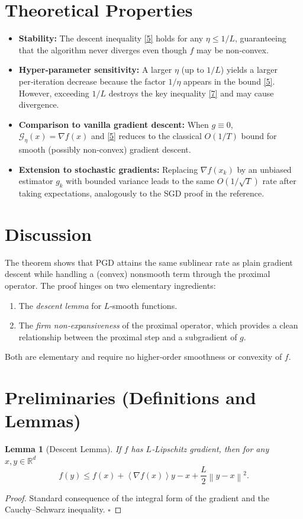 \documentclass{article}
\newtheorem{lemma}{Lemma}
\newcommand{\R}{\mathbb{R}}
\newcommand{\norm}[1]{\left\|#1\right\|}
\newcommand{\inner}[1]{\left\langle#1\right\rangle}
\newcommand{\grad}{\nabla}
\newcommand{\G}{\mathcal{G}}
\begin{document}
\section*{Theoretical Properties}
\begin{itemize}
\item \textbf{Stability:} The descent inequality \eqref{5} holds for any $\eta\le 1/L$, guaranteeing that the algorithm never diverges even though $f$ may be non‑convex.
\item \textbf{Hyper‑parameter sensitivity:} A larger $\eta$ (up to $1/L$) yields a larger per‑iteration decrease because the factor $1/\eta$ appears in the bound \eqref{5}. However, exceeding $1/L$ destroys the key inequality \eqref{7} and may cause divergence.
\item \textbf{Comparison to vanilla gradient descent:} When $g\equiv0$, $\G_{\eta}(x)=\grad f(x)$ and \eqref{5} reduces to the classical $O(1/T)$ bound for smooth (possibly non‑convex) gradient descent.
\item \textbf{Extension to stochastic gradients:} Replacing $\grad f(x_{k})$ by an unbiased estimator $g_{k}$ with bounded variance leads to the same $O(1/\sqrt{T})$ rate after taking expectations, analogously to the SGD proof in the reference.
\end{itemize}

\section*{Discussion}
The theorem shows that PGD attains the same sublinear rate as plain gradient descent while handling a (convex) nonsmooth term through the proximal operator. The proof hinges on two elementary ingredients:
\begin{enumerate}
\item The \emph{descent lemma} for $L$‑smooth functions.
\item The \emph{firm non‑expansiveness} of the proximal operator, which provides a clean relationship between the proximal step and a subgradient of $g$.
\end{enumerate}
Both are elementary and require no higher‑order smoothness or convexity of $f$.

\newpage
\section*{Preliminaries (Definitions and Lemmas)}
\begin{lemma}[Descent Lemma]\label{lem:descent}
If $f$ has $L$‑Lipschitz gradient, then for any $x,y\in\R^{d}$
\[
f(y)\le f(x)+\inner{\grad f(x)}{y-x}+\frac{L}{2}\norm{y-x}^{2}.
\tag{7}
\]
\end{lemma}
\begin{proof}
Standard consequence of the integral form of the gradient and the Cauchy–Schwarz inequality. \hfill $\square$
\end{proof}
\end{document}
